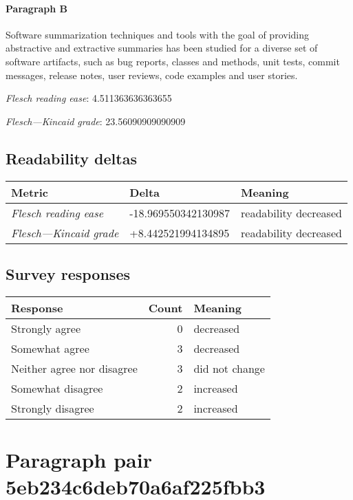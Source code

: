 \paragraph{Paragraph B}
Software summarization techniques and tools with the goal of providing abstractive and extractive summaries has been studied for a diverse set of software artifacts, such as bug reports, classes and methods, unit tests, commit messages, release notes, user reviews, code examples and user stories.\par\medskip\emph{Flesch reading ease}: 4.511363636363655\par\emph{Flesch---Kincaid grade}: 23.56090909090909

\subsection{Readability deltas}

\begin{tabular}{lll}
\toprule
               \textbf{Metric} &       \textbf{Delta} &       \textbf{Meaning} \\
\midrule
    \emph{Flesch reading ease} &  -18.969550342130987 &  readability decreased \\
 \emph{Flesch---Kincaid grade} &   +8.442521994134895 &  readability decreased \\
\bottomrule
\end{tabular}

\subsection{Survey responses}
\begin{tabular}{lrl}
\toprule
          \textbf{Response} &  \textbf{Count} & \textbf{Meaning} \\
\midrule
             Strongly agree &               0 &        decreased \\
             Somewhat agree &               3 &        decreased \\
 Neither agree nor disagree &               3 &   did not change \\
          Somewhat disagree &               2 &        increased \\
          Strongly disagree &               2 &        increased \\
\bottomrule
\end{tabular}

\section{Paragraph pair 5eb234c6deb70a6af225fbb3}
